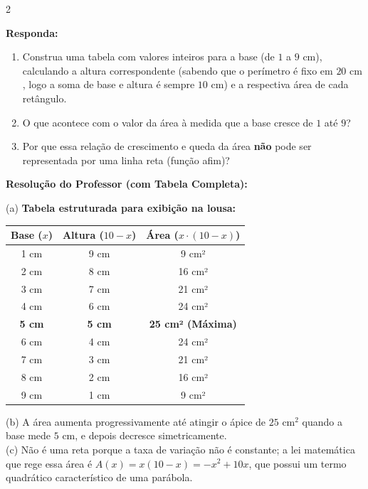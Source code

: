 \begin{multicols*}{2}
\begin{boxresponda}
\textbf{Responda:} 
\begin{enumerate}[label=\alph*), itemsep=\espacoAlt]
\item Construa uma tabela com valores inteiros para a base (de $1$ a $9\text{ cm}$), calculando a altura correspondente (sabendo que o perímetro é fixo em $20\text{ cm}$, logo a soma de base e altura é sempre $10\text{ cm}$) e a respectiva área de cada retângulo.
\item O que acontece com o valor da área à medida que a base cresce de $1$ até $9$?
\item Por que essa relação de crescimento e queda da área \textbf{não} pode ser representada por uma linha reta (função afim)?
\end{enumerate}
\end{boxresponda}

\ifgabarito
    \begin{tcolorbox}[colback=CorTitUm!5, colframe=CorTitUm, boxrule=1pt, arc=4pt, left=6pt, right=6pt, top=6pt, bottom=6pt]
    \small\textbf{\textcolor{CorTitUm}{Resolução do Professor (com Tabela Completa):}}\par\vspace{0.1cm}
    \color{CinzaEscuro}
    (a) \textbf{Tabela estruturada para exibição na lousa:}
    \begin{center}
    \small
    \begin{tabular}{|c|c|c|}
    \hline
    \textbf{Base ($x$)} & \textbf{Altura ($10 - x$)} & \textbf{Área ($x \cdot (10 - x)$)} \\ \hline
    1 cm & 9 cm & 9 cm² \\ \hline
    2 cm & 8 cm & 16 cm² \\ \hline
    3 cm & 7 cm & 21 cm² \\ \hline
    4 cm & 6 cm & 24 cm² \\ \hline
    \textbf{5 cm} & \textbf{5 cm} & \textbf{25 cm² (Máxima)} \\ \hline
    6 cm & 4 cm & 24 cm² \\ \hline
    7 cm & 3 cm & 21 cm² \\ \hline
    8 cm & 2 cm & 16 cm² \\ \hline
    9 cm & 1 cm & 9 cm² \\ \hline
    \end{tabular}
    \end{center}
    (b) A área aumenta progressivamente até atingir o ápice de $25\text{ cm}^2$ quando a base mede $5\text{ cm}$, e depois decresce simetricamente. \\
    (c) Não é uma reta porque a taxa de variação não é constante; a lei matemática que rege essa área é $A(x) = x(10-x) = -x^2 + 10x$, que possui um termo quadrático característico de uma parábola.
    \end{tcolorbox}
\fi


\end{multicols*}
